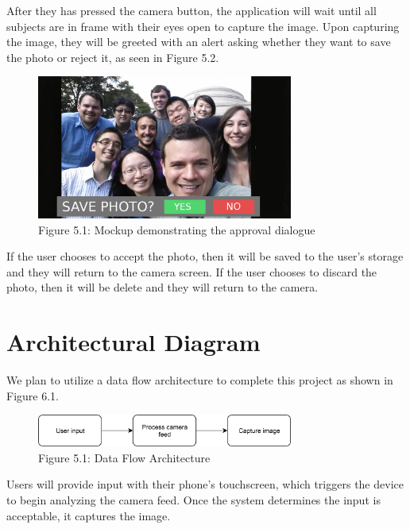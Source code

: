 \documentclass{scu-thesis}
\begin{document}
After they has pressed the camera button, the application will wait until all subjects are in frame with their eyes open to capture the image. Upon capturing the image, they will be greeted with an alert asking whether they want to save the photo or reject it, as seen in Figure 5.2.

\begin{figure}[!h]
    \centering
    \includegraphics[width=0.75\textwidth]{conceptualmodel2}
    \caption{Figure 5.1: Mockup demonstrating the approval dialogue}
    \label{fig:conceptualmodel2}
\end{figure}

If the user chooses to accept the photo, then it will be saved to the user's storage and they will return to the camera screen. If the user chooses to discard the photo, then it will be delete and they will return to the camera.


\chapter{Architectural Diagram}

We plan to utilize a data flow architecture to complete this project as shown in Figure 6.1.

\begin{figure}[!h]
    \centering
    \includegraphics[width=0.75\textwidth]{architecturediagram}
    \caption{Figure 5.1: Data Flow Architecture}
    \label{fig:architecturediagram}
\end{figure}

Users will provide input with their phone's touchscreen, which triggers the device to begin analyzing the camera feed. Once the system determines the input is acceptable, it captures the image. 









\backmatter
\end{document}
